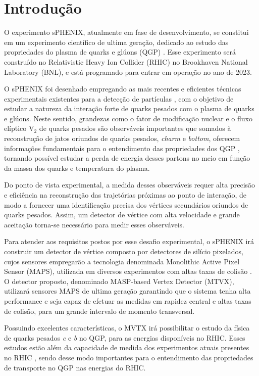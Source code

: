 \chapter{Introdução}

O experimento sPHENIX, atualmente em fase de desenvolvimento, se constitui em um experimento científico de ultima geração, dedicado ao estudo das propriedades do plasma de quarks e glúons (QGP) \cite{sPHENIXproposal}. Esse experimento será construído no Relativistic Heavy Ion Collider (RHIC) no Brookhaven National Laboratory (BNL), e está programado para entrar em operação no ano de 2023.

O sPHENIX foi desenhado empregando as mais recentes e eficientes técnicas experimentais existentes para a detecção de partículas \cite{sPHENIXproposal,1}, com o objetivo de estudar a natureza da interação forte de quarks pesados com o plasma de quarks e glúons. Neste sentido, grandezas como o fator de modificação nuclear e o fluxo elíptico V$_{2}$ de quarks pesados são observáveis importantes que somados à reconstrução de jatos oriundos de quarks pesados, \textit{charm} e \textit{bottom}, oferecem informações fundamentais para o entendimento das propriedades dos QGP \cite{2,3,4,5,6,7}, tornando possível estudar a perda de energia desses partons no meio em função da massa dos quarks e temperatura do plasma.

Do ponto de vista experimental, a medida desses observáveis requer alta precisão e eficiência na reconstrução das trajetórias próximas ao ponto de interação, de modo a fornecer uma identificação precisa dos vértices secundários oriundos de quarks pesados. Assim, um detector de vértice com alta velocidade e grande aceitação torna-se necessário para medir esses observáveis.  

Para atender aos requisitos postos por esse desafio experimental, o sPHENIX irá construir um detector de vértice composto por detectores de silício pixelados, cujos sensores empregarão a tecnologia denominada Monolithic Active Pixel Sensor (MAPS), utilizada em diversos experimentos com altas taxas de colisão \cite{8,9,10}. O detector proposto, denominado MASP-based Vertex Detector (MTVX), utilizará sensores MAPS de ultima geração garantindo que o sistema tenha alta performance e seja capaz de efetuar as medidas em rapidez central e altas taxas de colisão, para um grande intervalo de momento transversal.

Possuindo excelentes características, o MVTX irá possibilitar o estudo da física de quarks pesados \textit{c} e \textit{b} no QGP, para as energias disponíveis no RHIC. Esses estudos estão além da capacidade de medida dos experimentos atuais presentes no RHIC \cite{5,6,7}, sendo desse modo importantes para o entendimento das propriedades de transporte no QGP nas energias do RHIC.

